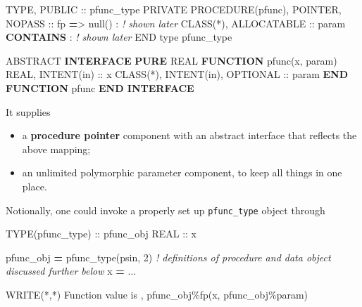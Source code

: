 \documentclass[
]{scrartcl}
\newenvironment{Shaded}{}{}
\newcommand{\CommentTok}[1]{\textcolor[rgb]{0.38,0.63,0.69}{\textit{#1}}}
\newcommand{\DataTypeTok}[1]{\textcolor[rgb]{0.56,0.13,0.00}{#1}}
\newcommand{\DecValTok}[1]{\textcolor[rgb]{0.25,0.63,0.44}{#1}}
\newcommand{\FunctionTok}[1]{\textcolor[rgb]{0.02,0.16,0.49}{#1}}
\newcommand{\KeywordTok}[1]{\textcolor[rgb]{0.00,0.44,0.13}{\textbf{#1}}}
\newcommand{\NormalTok}[1]{#1}
\newcommand{\OperatorTok}[1]{\textcolor[rgb]{0.40,0.40,0.40}{#1}}
\newcommand{\StringTok}[1]{\textcolor[rgb]{0.25,0.44,0.63}{#1}}
\providecommand{\tightlist}{%
  \setlength{\itemsep}{0pt}\setlength{\parskip}{0pt}}
\begin{document}
\begin{Shaded}
\begin{Highlighting}[]
\DataTypeTok{TYPE}\NormalTok{, }\DataTypeTok{PUBLIC} \DataTypeTok{::}\NormalTok{ pfunc\_type}
   \DataTypeTok{PRIVATE}
   \DataTypeTok{PROCEDURE(pfunc)}\NormalTok{, }\DataTypeTok{POINTER}\NormalTok{, }\DataTypeTok{NOPASS} \DataTypeTok{::}\NormalTok{ fp }\KeywordTok{=}\OperatorTok{\textgreater{}}\NormalTok{ null()}
\NormalTok{   : }\CommentTok{! shown later}
   \DataTypeTok{CLASS(*)}\NormalTok{, }\DataTypeTok{ALLOCATABLE} \DataTypeTok{::}\NormalTok{ param}
\KeywordTok{CONTAINS}
\NormalTok{   : }\CommentTok{! shown later}
\DataTypeTok{END type}\NormalTok{ pfunc\_type}

\DataTypeTok{ABSTRACT} \KeywordTok{INTERFACE}
   \KeywordTok{PURE} \DataTypeTok{REAL} \KeywordTok{FUNCTION}\NormalTok{ pfunc(x, param)}
      \DataTypeTok{REAL}\NormalTok{, }\DataTypeTok{INTENT(in)} \DataTypeTok{::}\NormalTok{ x}
      \DataTypeTok{CLASS(*)}\NormalTok{, }\DataTypeTok{INTENT(in)}\NormalTok{, }\DataTypeTok{OPTIONAL} \DataTypeTok{::}\NormalTok{ param}
   \KeywordTok{END FUNCTION}\NormalTok{ pfunc}
\KeywordTok{END INTERFACE}
\end{Highlighting}
\end{Shaded}

It supplies

\begin{itemize}
\tightlist
\item
  a \textbf{procedure pointer} component with an abstract interface that
  reflects the above mapping;
\item
  an unlimited polymorphic parameter component, to keep all things in
  one place.
\end{itemize}

Notionally, one could invoke a properly set up \texttt{pfunc\_type}
object through

\begin{Shaded}
\begin{Highlighting}[]
\DataTypeTok{TYPE(pfunc\_type)} \DataTypeTok{::}\NormalTok{ pfunc\_obj}
\DataTypeTok{REAL} \DataTypeTok{::}\NormalTok{ x}

\NormalTok{pfunc\_obj }\KeywordTok{=}\NormalTok{ pfunc\_type(psin, }\DecValTok{2}\NormalTok{)}
\CommentTok{! definitions of procedure and data object discussed further below}
\NormalTok{x }\KeywordTok{=}\NormalTok{ ...}

\FunctionTok{WRITE(*}\NormalTok{,}\FunctionTok{*)} \StringTok{\textquotesingle{}Function value is \textquotesingle{}}\NormalTok{, pfunc\_obj}\OperatorTok{\%}\NormalTok{fp(x, pfunc\_obj}\OperatorTok{\%}\NormalTok{param)}
\end{Highlighting}
\end{Shaded}
\end{document}
